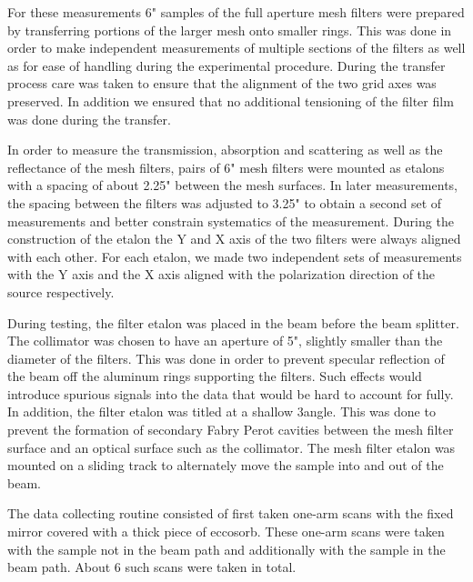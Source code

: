 \documentclass[12pt]{article}
\begin{document}
For these measurements 6" samples of the full aperture mesh filters were
prepared by transferring portions of the larger mesh onto smaller rings. This
was done in order to make independent measurements of multiple sections of the
filters as well as for ease of handling during the experimental procedure.
During the transfer process care was taken to ensure that the alignment of the
two grid axes was preserved. In addition we ensured that no additional
tensioning of the filter film was done during the transfer.

In order to measure the transmission, absorption and scattering as well as the
reflectance of the mesh filters, pairs of 6" mesh filters were mounted as
etalons with a spacing of about 2.25" between the mesh surfaces. In later
measurements, the spacing between the filters was adjusted to 3.25" to obtain a
second set of measurements and better constrain systematics of the measurement.
During the construction of the etalon the Y and X axis of the two filters were
always aligned with each other. For each etalon, we made two independent sets of
measurements with the Y axis and the X axis aligned with the polarization
direction of the source respectively.

During testing, the filter etalon was placed in the beam before the beam
splitter. The collimator was chosen to have an aperture of 5", slightly smaller
than the diameter of the filters. This was done in order to prevent specular
reflection of the beam off the aluminum rings supporting the filters. Such
effects would introduce spurious signals into the data that would be hard to
account for fully. In addition, the filter etalon was titled at a shallow
3\textdegree angle. This was done to prevent the formation of secondary Fabry
Perot cavities between the mesh filter surface and an optical surface such as
the collimator. The mesh filter etalon was mounted on a sliding track to
alternately move the sample into and out of the beam.

The data collecting routine consisted of first taken one-arm scans with the
fixed mirror covered with a thick piece of eccosorb. These one-arm scans were
taken with the sample not in the beam path and additionally with the sample in
the beam path. About 6 such scans were taken in total.  
\end{document}
